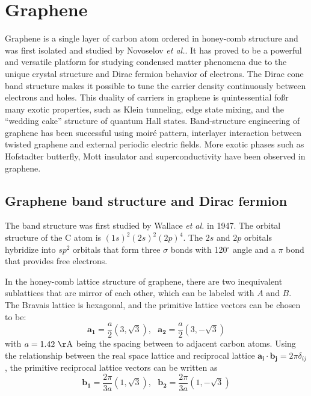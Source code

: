 \documentclass[pdflatex, sectionletters, 12pt, final, phd]{pittetd}    %
\begin{document}
\section{Graphene}

Graphene is a single layer of carbon atom ordered in honey-comb structure and was first isolated and studied by Novoselov \textit{et al.}\cite{novoselov2004electric}. It has proved to be a powerful and versatile platform for studying condensed matter phenomena due to the unique crystal structure and Dirac fermion behavior of electrons\cite{wilson2006electrons}. The Dirac cone band structure makes it possible to tune the carrier density continuously between electrons and holes. This duality of carriers in graphene is quintessential foßr many exotic properties, such as Klein tunneling\cite{allain2011klein, katsnelson2006chiral, young2009quantum, shytov2008klein}, edge state mixing\cite{williams2007quantum, abanin2007quantized, lohmann2009four, amet2014selective}, and the ``wedding cake'' structure of quantum Hall states\cite{gutierrez2018interaction}. Band-structure engineering of graphene has been successful using moir{\'e} pattern\cite{dean2013hofstadter, hunt2013massive, ponomarenko2013cloing}, interlayer interaction between twisted graphene\cite{cao2018correlated, cao2018unconventional} and external periodic electric fields\cite{forsythe2018band}. More exotic phases such as Hofstadter butterfly\cite{dean2013hofstadter, hunt2013massive, forsythe2018band}, Mott insulator\cite{cao2018correlated} and superconductivity\cite{cao2018unconventional} have been observed in graphene.

\subsection{Graphene band structure and Dirac fermion}

The band structure was first studied by Wallace \textit{et al.} in 1947\cite{wallace1947band}. The orbital structure of the C atom is $(1s)^2(2s)^2(2p)^4$. The $2s$ and $2p$ orbitals hybridize into $sp^2$ orbitals that form three $\sigma$ bonds with 120$^{\circ}$ angle and a $\pi$ bond that provides free electrons. 

In the honey-comb lattice structure of graphene, there are two inequivalent sublattices that are mirror of each other, which can be labeled with $A$ and $B$. The Bravais lattice is hexagonal, and the primitive lattice vectors can be chosen to be: 
$$\mathbf{a_1} = \frac{a}{2}\left(3, \sqrt{3}\right), \ \ \ \mathbf{a_2} = \frac{a}{2}\left(3, -\sqrt{3}\right)$$
with $a = 1.42 \ \mathrm{\AA}$ being the spacing between to adjacent carbon atoms. Using the relationship between the real space lattice and reciprocal lattice $\mathbf{a_i}\cdot\mathbf{b_j} = 2\pi\delta_{ij}$, the primitive reciprocal lattice vectors can be written as 
$$\mathbf{b_1} = \frac{2\pi}{3a}\left(1, \sqrt{3}\right), \ \ \ \mathbf{b_2} = \frac{2\pi}{3a}\left(1, -\sqrt{3}\right)$$
\end{document}
